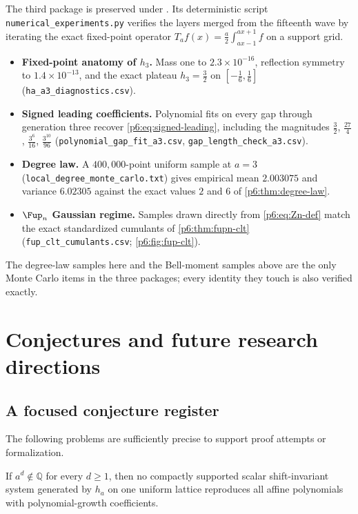 \documentclass[11pt,oneside]{article}
\numberwithin{equation}{section}
\theoremstyle{definition}
\theoremstyle{remark}
\newcommand{\Q}{\mathbb Q}
\begin{document}
The third package is preserved under
.  Its deterministic script
\texttt{numerical\_experiments.py} verifies the layers merged from the
fifteenth wave by iterating the exact fixed-point operator
$T_af(x)=\tfrac a2\int_{ax-1}^{ax+1}f$ on a support grid.
\begin{itemize}
\item \textbf{Fixed-point anatomy of $h_3$.}  Mass one to
$2.3\times10^{-16}$, reflection symmetry to $1.4\times10^{-13}$, and the
exact plateau $h_3=\tfrac32$ on $[-\tfrac16,\tfrac16]$
(\texttt{ha\_a3\_diagnostics.csv}).
\item \textbf{Signed leading coefficients.}  Polynomial fits on every gap
through generation three recover \eqref{p6:eq:signed-leading}, including the
magnitudes $\tfrac32$, $\tfrac{27}4$, $\tfrac{3^6}{16}$, $\tfrac{3^{10}}{96}$
(\texttt{polynomial\_gap\_fit\_a3.csv}, \texttt{gap\_length\_check\_a3.csv}).
\item \textbf{Degree law.}  A $400{,}000$-point uniform sample at $a=3$
(\texttt{local\_degree\_monte\_carlo.txt}) gives empirical mean $2.003075$
and variance $6.02305$ against the exact values $2$ and $6$ of
\cref{p6:thm:degree-law}.
\item \textbf{$\Fup_n$ Gaussian regime.}  Samples drawn directly from
\eqref{p6:eq:Zn-def} match the exact standardized cumulants of
\cref{p6:thm:fupn-clt} (\texttt{fup\_clt\_cumulants.csv};
\cref{p6:fig:fup-clt}).
\end{itemize}
The degree-law samples here and the Bell-moment samples above are the only
Monte Carlo items in the three packages; every identity they touch is also
verified exactly.

\section{Conjectures and future research directions}\label{p6:sec:future-directions}

\subsection{A focused conjecture register}

The following problems are sufficiently precise to support proof attempts or
formalization.

\begin{conjecture}
If $a^d\notin\Q$ for every $d\ge1$, then no compactly supported scalar
shift-invariant system generated by $h_a$ on one uniform lattice reproduces all
affine polynomials with polynomial-growth coefficients.
\end{conjecture}
\end{document}
